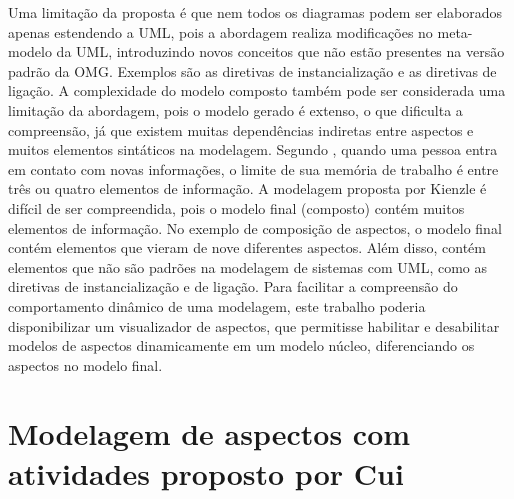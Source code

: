 Uma limitação da proposta é que nem todos os diagramas podem ser elaborados apenas estendendo a UML, pois a abordagem realiza modificações no
meta-modelo da UML, introduzindo novos conceitos que não estão presentes na versão padrão da OMG. Exemplos são as diretivas de instancialização e as diretivas de ligação. 
A complexidade do modelo composto também pode ser considerada uma limitação da abordagem, pois o modelo gerado é extenso, o que dificulta a
compreensão, já que existem muitas dependências indiretas entre aspectos e muitos elementos sintáticos na modelagem. Segundo \cite{seventwo:11},
quando uma pessoa entra em contato com novas informações, o limite de sua memória de trabalho é entre três ou quatro elementos de informação. A
modelagem proposta por Kienzle é difícil de ser compreendida, pois o modelo final (composto) contém muitos
elementos de informação. No exemplo de composição de aspectos, o modelo final contém elementos que vieram de nove diferentes aspectos. Além disso, contém elementos
que não são padrões na modelagem de sistemas com UML, como as diretivas de instancialização e de ligação. Para facilitar a compreensão do
comportamento dinâmico de uma modelagem, este trabalho poderia disponibilizar um visualizador de aspectos, que permitisse habilitar e desabilitar
modelos de aspectos dinamicamente em um modelo núcleo, diferenciando os aspectos no modelo final.

\section{Modelagem de aspectos com atividades proposto por Cui}

